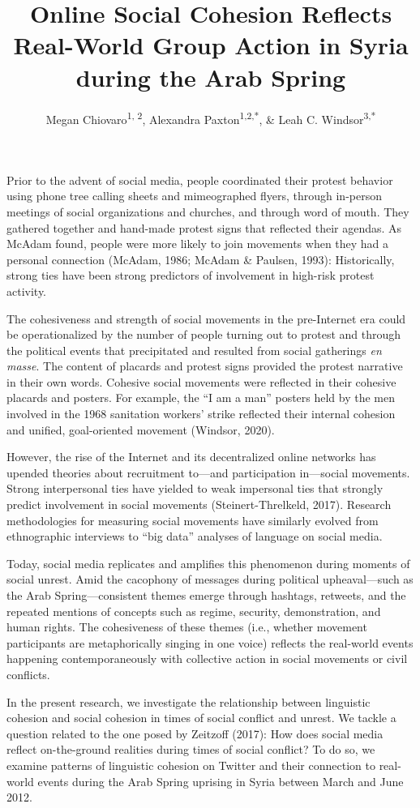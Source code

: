 \documentclass[
  english,
  man]{apa6}
\author{Megan Chiovaro\textsuperscript{1, 2}, Alexandra Paxton\textsuperscript{1,2,*}, \& Leah C. Windsor\textsuperscript{3,*}}
\affiliation{
\vspace{0.5cm}
\textsuperscript{1} Center for the Ecological Study of Perception and Action, University of Connecticut\\\textsuperscript{2} Department of Psychological Sciences, University of Connecticut\\\textsuperscript{3} University of Memphis\\\textsuperscript{*} Equal author contributions}
\title{Online Social Cohesion Reflects Real-World Group Action in Syria during the Arab Spring}
\date{}
\begin{document}
\maketitle

Prior to the advent of social media, people coordinated their protest behavior
using phone tree calling sheets and mimeographed flyers,
through in-person meetings of social organizations and churches, and through
word of mouth. They gathered together and hand-made protest signs that reflected
their agendas. As McAdam found, people were more likely to join movements when
they had a personal connection (McAdam, 1986; McAdam \& Paulsen, 1993):
Historically, strong ties have been
strong predictors of involvement in high-risk protest activity.

The cohesiveness and strength of social movements in the pre-Internet era could be
operationalized by the number of people turning out to protest and through the
political events that precipitated and resulted from social gatherings \emph{en masse}.
The content of placards and protest
signs provided the protest narrative in their own words. Cohesive
social movements were reflected in their cohesive placards and posters. For
example, the \enquote{I am a man} posters held by the men involved in the 1968
sanitation workers' strike reflected their internal cohesion and unified,
goal-oriented movement (Windsor, 2020).

However, the rise of the Internet and its decentralized online networks
has upended theories about recruitment to---and participation in---social
movements. Strong interpersonal ties have yielded to weak impersonal ties that
strongly predict involvement in social movements (Steinert-Threlkeld, 2017). Research
methodologies for measuring social movements have similarly evolved from
ethnographic interviews to \enquote{big data} analyses of language on social media.

Today, social media replicates and amplifies
this phenomenon during moments of social unrest. Amid the cacophony of messages
during political upheaval---such as the Arab Spring---consistent themes emerge
through hashtags, retweets, and the repeated mentions of concepts such as
regime, security, demonstration, and human rights. The cohesiveness of these
themes (i.e., whether movement participants are metaphorically singing in one voice)
reflects the real-world events happening contemporaneously with collective action in
social movements or civil conflicts.

In the present research, we investigate the relationship between linguistic
cohesion and social cohesion in times of social conflict and unrest. We tackle a
question related to the one posed by Zeitzoff (2017): How does
social media reflect on-the-ground realities during times of social conflict?
To do so, we examine patterns of linguistic cohesion on Twitter and their
connection to real-world events during
the Arab Spring uprising in Syria between March and June 2012.
\end{document}
